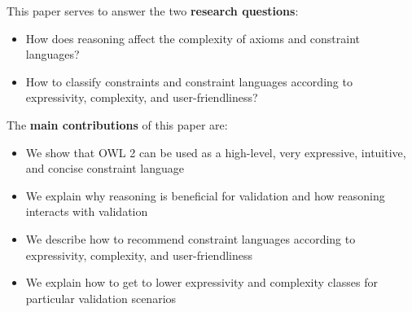 \documentclass{llncs}
\begin{document}
%

This paper serves to answer the two \textbf{research questions}:
\begin{itemize}
	\item How does reasoning affect the complexity of axioms and constraint languages?
	\item How to classify constraints and constraint languages according to expressivity, complexity, and user-friendliness?
\end{itemize}

The \textbf{main contributions} of this paper are:
\begin{itemize}
	\item We show that OWL 2 can be used as a high-level, very expressive, intuitive, and concise constraint language
	\item We explain why reasoning is beneficial for validation and how reasoning interacts with validation
	\item We describe how to recommend constraint languages according to expressivity, complexity, and user-friendliness
	\item We explain how to get to lower expressivity and complexity classes for particular validation scenarios 
\end{itemize}
\end{document}
